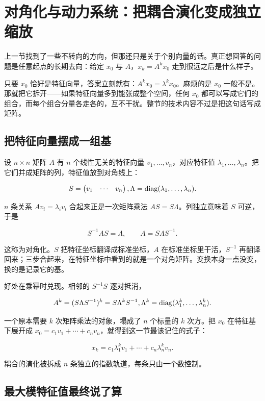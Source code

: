 \section{对角化与动力系统：把耦合演化变成独立缩放}
\label{sec:03-Linear-Algebra/05-Eigenvalues-and-Eigenvectors/02}

上一节找到了一些不转向的方向，但那还只是关于个别向量的话。真正想回答的问题是任意起点的长期去向：给定 \(x_0\) 与 \(A\)，\(x_k=A^kx_0\) 走到很远之后是什么样子。

只要 \(x_0\) 恰好是特征向量，答案立刻就有：\(A^kx_0=\lambda^kx_0\)。麻烦的是 \(x_0\) 一般不是。那就把它拆开——如果特征向量多到能张成整个空间，任何 \(x_0\) 都可以写成它们的组合，而每个组合分量各走各的，互不干扰。整节的技术内容不过是把这句话写成矩阵。

\subsection{把特征向量摆成一组基}

设 \(n\times n\) 矩阵 \(A\) 有 \(n\) 个线性无关的特征向量 \(v_1,\dots,v_n\)，对应特征值 \(\lambda_1,\dots,\lambda_n\)。把它们并成矩阵的列，特征值放到对角线上：

\[
S=\begin{pmatrix}v_1&\cdots&v_n\end{pmatrix},
\space
\Lambda=\operatorname{diag}(\lambda_1,\dots,\lambda_n).
\]

\(n\) 条关系 \(Av_i=\lambda_i v_i\) 合起来正是一次矩阵乘法 \(AS=S\Lambda\)。列独立意味着 \(S\) 可逆，于是

\[
S^{-1}AS=\Lambda,
\qquad
A=S\Lambda S^{-1}.
\]

这称为对角化。\(S\) 把特征坐标翻译成标准坐标，\(A\) 在标准坐标里干活，\(S^{-1}\) 再翻译回来；三步合起来，在特征坐标中看到的就是一个对角矩阵。变换本身一点没变，换的是记录它的基。

好处在乘幂时兑现。相邻的 \(S^{-1}S\) 逐对抵消，

\[
A^k=(S\Lambda S^{-1})^k=S\Lambda^kS^{-1},
\space
\Lambda^k=\operatorname{diag}(\lambda_1^k,\dots,\lambda_n^k).
\]

一个原本需要 \(k\) 次矩阵乘法的对象，塌成了 \(n\) 个标量的 \(k\) 次方。把 \(x_0\) 在特征基下展开成 \(x_0=c_1v_1+\cdots+c_nv_n\)，就得到这一节最该记住的式子：

\[
x_k=c_1\lambda_1^k v_1+\cdots+c_n\lambda_n^k v_n .
\]

耦合的演化被拆成 \(n\) 条独立的指数轨道，每条只由一个数控制。

\subsection{最大模特征值最终说了算}

